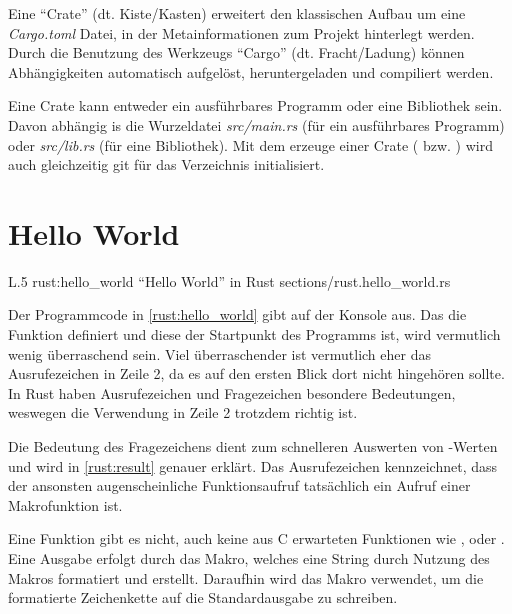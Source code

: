 Eine \enquote{Crate} (dt. Kiste/Kasten) erweitert den klassischen Aufbau um eine \textit{Cargo.toml} Datei, in der Metainformationen zum Projekt hinterlegt werden.
Durch die Benutzung des Werkzeugs \enquote{Cargo} (dt. Fracht/Ladung) können Abhängigkeiten automatisch aufgelöst, heruntergeladen und compiliert werden.

Eine Crate kann entweder ein ausführbares Programm oder eine Bibliothek sein.
Davon abhängig is die Wurzeldatei \textit{src/main.rs} (für ein ausführbares Programm) oder \textit{src/lib.rs} (für eine Bibliothek).
Mit dem erzeuge einer Crate ( bzw. ) wird auch gleichzeitig \gls{git} für das Verzeichnis initialisiert.

\section{Hello World}


\begin{wrapfigure}{L}{.5\textwidth}
	\rustcinclude
		{rust:hello_world}
		{\enquote{Hello World} in Rust}
		{sections/rust.hello_world.rs}
\end{wrapfigure}

Der Programmcode in \autoref{rust:hello_world} gibt auf der Konsole  aus.
Das  die Funktion  definiert und diese der Startpunkt des Programms ist, wird vermutlich wenig überraschend sein.
Viel überraschender ist vermutlich eher das Ausrufezeichen in Zeile 2, da es auf den ersten Blick dort nicht hingehören sollte.
In Rust haben Ausrufezeichen und Fragezeichen besondere Bedeutungen, weswegen die Verwendung in Zeile 2 trotzdem richtig ist.

Die Bedeutung des Fragezeichens dient zum schnelleren Auswerten von -Werten und wird in \autoref{rust:result} genauer erklärt.
Das Ausrufezeichen kennzeichnet, dass der ansonsten augenscheinliche Funktionsaufruf tatsächlich ein Aufruf einer Makrofunktion ist.

Eine Funktion  gibt es nicht, auch keine aus C erwarteten Funktionen wie ,  oder .
Eine Ausgabe erfolgt durch das  Makro, welches eine String durch Nutzung des  Makros formatiert und erstellt.
Daraufhin wird das  Makro verwendet, um die formatierte Zeichenkette auf die Standardausgabe zu schreiben.

